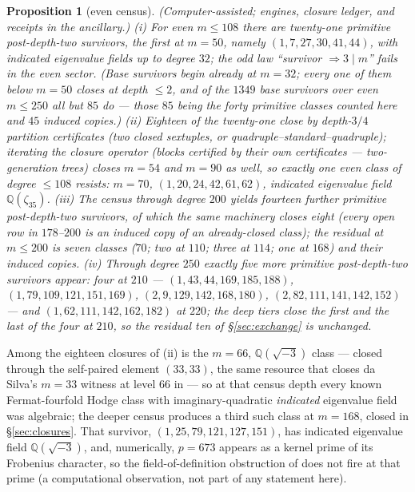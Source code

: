 \documentclass[11pt]{amsart}
\newtheorem{proposition}[theorem]{Proposition}
\theoremstyle{remark}
\newcommand{\Q}{\mathbb{Q}}
\newcommand{\zt}{\zeta}
\begin{document}
\begin{proposition}[even census]\label{prop:evencensus}
{\rm(Computer-assisted; engines, closure ledger, and receipts in the ancillary.)}
(i) For even $m\le108$ there are twenty-one primitive post-depth-two survivors, the first at
$m=50$, namely $(1,7,27,30,41,44)$, with indicated eigenvalue fields up to degree $32$; the odd
law ``survivor $\Rightarrow3\mid m$'' fails in the even sector. (Base survivors begin already at
$m=32$; every one of them below $m=50$ closes at depth $\le2$, and of the $1349$ base survivors
over even $m\le250$ all but $85$ do --- those $85$ being the forty primitive classes counted here
and $45$ induced copies.) (ii) Eighteen of the twenty-one close by
depth-$3/4$ partition certificates (two closed sextuples, or quadruple--standard--quadruple);
iterating the closure operator (blocks certified by their own certificates --- two-generation
trees) closes $m=54$ and $m=90$ as well, so exactly one even class of degree $\le108$ resists:
$m=70$, $(1,20,24,42,61,62)$, indicated eigenvalue field $\Q(\zt_{35})$. (iii) The census through degree
$200$ yields fourteen further primitive post-depth-two survivors, of which the same machinery closes eight (every
open row in $178$--$200$ is an induced copy of an already-closed class); the residual at
$m\le200$ is seven classes ($70$; two at $110$; three at $114$; one at $168$) and their induced
copies. (iv) Through degree $250$ exactly five more primitive post-depth-two survivors appear: four at
$210$ --- $(1,43,44,169,185,188)$, $(1,79,109,121,151,169)$, $(2,9,129,142,168,180)$,
$(2,82,111,141,142,152)$ --- and $(1,62,111,142,162,182)$ at $220$; the deep tiers close the
first and the last of the four at $210$, so the residual ten of \S\ref{sec:exchange} is
unchanged.
\end{proposition}

Among the eighteen closures of (ii) is the $m=66$, $\Q(\sqrt{-3})$ class --- closed through the
self-paired element $(33,33)$, the same resource that closes da Silva's $m=33$ witness at level
$66$ in \cite[Thm.~A$''$]{BN} --- so at that census depth every known Fermat-fourfold Hodge
class with imaginary-quadratic \emph{indicated} eigenvalue field was algebraic; the deeper
census produces a third such class at $m=168$, closed in \S\ref{sec:closures}. That survivor,
$(1,25,79,121,127,151)$, has indicated eigenvalue field $\Q(\sqrt{-3})$, and, numerically, $p=673$ appears as a kernel
prime of its Frobenius character, so the field-of-definition obstruction of \cite[Thm.~C]{BN}
does not fire at that prime (a computational observation, not part of any statement here).
\end{document}

